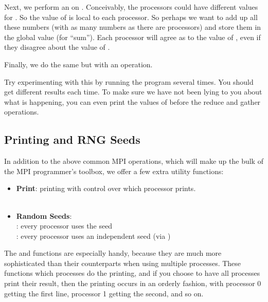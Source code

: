 Next, we perform an 
on . Conceivably, the processors could have different
values for . So the value of  is
local to each processor. So perhaps we want to add up all these numbers (with
as many numbers as there are processors) and store them in the global value
 (for ``sum''). Each processor will agree as to the value
of , even if they disagree about the value of .

Finally, we do the same but with an
 operation.

Try experimenting with this by running the program several times.
You should get different results each time. To make sure we have not
been lying to you about what is happening, you can even print the values
of  before the reduce and gather operations.



\subsection{Printing and RNG Seeds}\label{sec:pbdsugar}

In addition to the above common MPI operations, which will make up the bulk of
the MPI programmer's toolbox, we offer a few extra utility functions:

\begin{itemize}
  \item \textbf{Print}: printing with control over which processor prints.\\
        \\
  \item \textbf{Random Seeds}: \\
        : every processor uses the
        seed  \\
        : every processor uses an independent
        seed (via )
\end{itemize}

The  and  functions are especially handy,
because they are much more sophisticated than their  counterparts
when using multiple processes. These functions which processes do the
printing, and if you choose to have all processes print their result, then
the printing occurs in an orderly fashion, with processor 0 getting the
first line, processor 1 getting the second, and so on.

